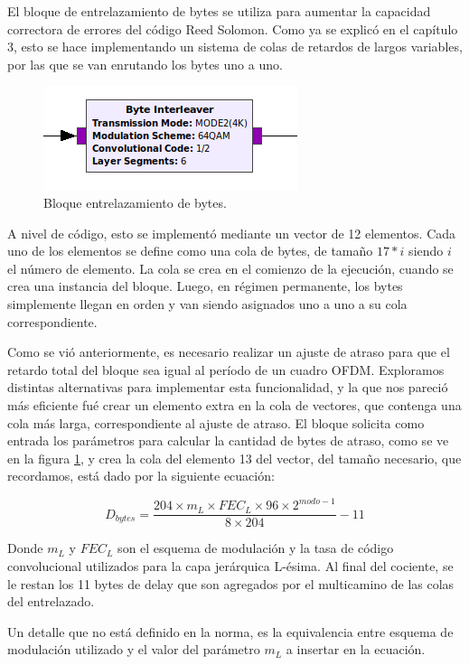 El bloque de entrelazamiento de bytes se utiliza para aumentar la capacidad correctora de errores del código Reed Solomon. Como ya se explicó en el capítulo 3, esto se hace implementando un sistema de colas de retardos de largos variables, por las que se van enrutando los bytes uno a uno. 

\begin{figure}[!h]
	\centering
	\includegraphics[scale=0.6]{figuras/cap05/byteint}
	\caption{\label{f:byteint} Bloque entrelazamiento de bytes.}
\end{figure}

A nivel de código, esto se implementó mediante un vector de 12 elementos. Cada uno de los elementos se define como una cola de bytes, de tamaño $17*i$ siendo $i$ el número de elemento. La cola se crea en el comienzo de la ejecución, cuando se crea una instancia del bloque. Luego, en régimen permanente, los bytes simplemente llegan en orden y van siendo asignados uno a uno a su cola correspondiente.

Como se vió anteriormente, es necesario realizar un ajuste de atraso para que el retardo total del bloque sea igual al período de un cuadro OFDM. Exploramos distintas alternativas para implementar esta funcionalidad, y la que nos pareció más eficiente fué crear un elemento extra en la cola de vectores, que contenga una cola más larga, correspondiente al ajuste de atraso. El bloque solicita como entrada los parámetros para calcular la cantidad de bytes de atraso, como se ve en la figura \ref{f:byteint}, y crea la cola del elemento 13 del vector, del tamaño necesario, que recordamos, está dado por la siguiente ecuación:

\begin{equation}
D_{bytes} = \frac{204\times m_L\times FEC_L \times 96\times2^{modo-1}}{8\times204} - 11
\end{equation}

Donde $m_L$ y $FEC_L$ son el esquema de modulación y la tasa de código convolucional utilizados para la capa jerárquica L-ésima. Al final del cociente, se le restan los 11 bytes de delay que son agregados por el multicamino de las colas del entrelazado.

Un detalle que no está definido en la norma, es la equivalencia entre esquema de modulación utilizado y el valor del parámetro $m_L$ a insertar en la ecuación. 

